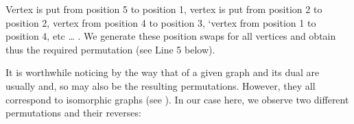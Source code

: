 \documentclass[a4paper,10pt,english]{sphinxhowto}
\begin{document}
Vertex  is put from position 5 to position 1, vertex  is put from position 2 to position 2, vertex  from position 4 to position 3, ‘vertex  from position 1 to position 4, etc … . We generate these position swaps for all vertices and obtain thus the required permutation (see Line 5 below).

\begin{sphinxVerbatim}[commandchars=\\\{\},numbers=left,firstnumber=1,stepnumber=1]
  \PYG{p}{[}    \PYG{p}{]}
   
    \PYG{p}{[}\PYG{p}{[}\PYG{p}{]}\PYG{p}{]}  
\end{sphinxVerbatim}

It is worthwhile noticing by the way that  of a given graph and its dual are usually  and, so may also be the resulting permutations. However, they all correspond to isomorphic graphs (see ). In our case here, we observe two different permutations and their reverses:
\end{document}
